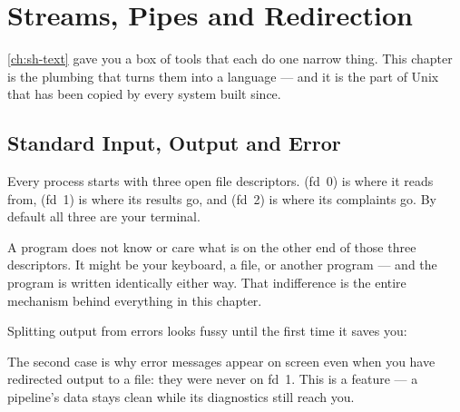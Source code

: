 \chapter{Streams, Pipes and Redirection}\label{ch:sh-pipes}

\autoref{ch:sh-text} gave you a box of tools that each do one narrow thing.
This chapter is the plumbing that turns them into a language --- and it is the
part of Unix that has been copied by every system built since.

\section{Standard Input, Output and Error}\label{sec:sh-streams}

\begin{definition}
	Every process starts with three open file descriptors. 
	(fd~0) is where it reads from,  (fd~1) is where its
	results go, and  (fd~2) is where its complaints go.
	By default all three are your terminal.
\end{definition}

\begin{intuition}
	A program does not know or care what is on the other end of those three
	descriptors. It might be your keyboard, a file, or another program --- and the
	program is written identically either way. That indifference is the entire
	mechanism behind everything in this chapter.
\end{intuition}

Splitting output from errors looks fussy until the first time it saves you:


\begin{note}
	The second case is why error messages appear on screen even when you have
	redirected output to a file: they were never on fd~1. This is a feature ---
	a pipeline's data stays clean while its diagnostics still reach you.
\end{note}

